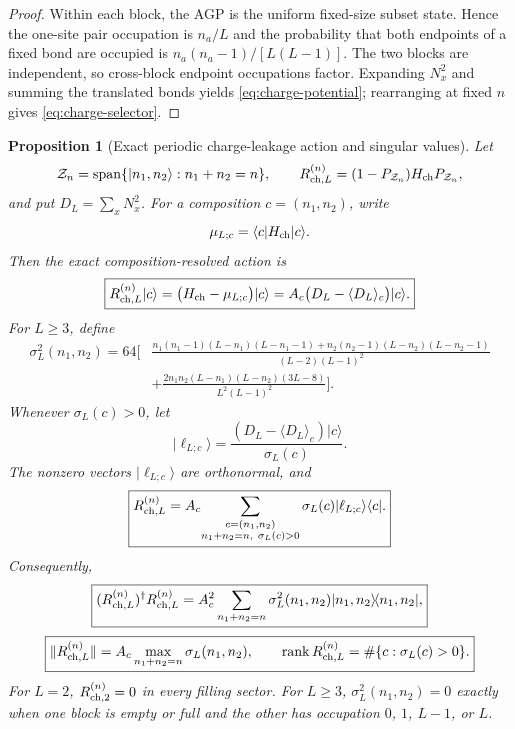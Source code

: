 \documentclass[11pt]{article}
\newtheorem{proposition}[theorem]{Proposition}
\theoremstyle{definition}
\theoremstyle{remark}
\newcommand{\ket}[1]{\lvert #1\rangle}
\newcommand{\bra}[1]{\langle #1\rvert}
\newcommand{\norm}[1]{\lVert #1\rVert}
\begin{document}
\begin{proof}
Within each block, the AGP is the uniform fixed-size subset state.  Hence the one-site pair occupation is $n_a/L$ and the probability that both endpoints of a fixed bond are occupied is $n_a(n_a-1)/[L(L-1)]$.  The two blocks are independent, so cross-block endpoint occupations factor.  Expanding $N_x^2$ and summing the translated bonds yields \eqref{eq:charge-potential}; rearranging at fixed $n$ gives \eqref{eq:charge-selector}.
\end{proof}

\begin{proposition}[Exact periodic charge-leakage action and singular values]
\label{prop:charge-leakage-periodic}
Let
\[
 \mathcal Z_n=\operatorname{span}\{\ket{n_1,n_2}:n_1+n_2=n\},
 \qquad
 R_{{\rm ch},L}^{(n)}=(1-P_{\mathcal Z_n})H_{\rm ch}P_{\mathcal Z_n},
\]
and put $D_L=\sum_x N_x^2$.  For a composition $c=(n_1,n_2)$, write
\[
 \mu_{L;c}=\bra cH_{\rm ch}\ket c.
\]
Then the exact composition-resolved action is
\begin{equation}
 \boxed{
 R_{{\rm ch},L}^{(n)}\ket c
 =\bigl(H_{\rm ch}-\mu_{L;c}\bigr)\ket c
 =A_c\bigl(D_L-\langle D_L\rangle_c\bigr)\ket c.}
 \label{eq:periodic-charge-leakage-action}
\end{equation}
For $L\ge3$, define
\begin{equation}
\boxed{
\begin{aligned}
\sigma_L^2(n_1,n_2)=64\Bigg[&
\frac{n_1(n_1-1)(L-n_1)(L-n_1-1)
+n_2(n_2-1)(L-n_2)(L-n_2-1)}{(L-2)(L-1)^2}\\
&+\frac{2n_1n_2(L-n_1)(L-n_2)(3L-8)}{L^2(L-1)^2}
\Bigg].
\end{aligned}}
\label{eq:periodic-charge-leakage-variance}
\end{equation}
Whenever $\sigma_L(c)>0$, let
\begin{equation}
 \ket{\ell_{L;c}}
 =\frac{(D_L-\langle D_L\rangle_c)\ket c}{\sigma_L(c)}.
 \label{eq:periodic-charge-left-singular-vector}
\end{equation}
The nonzero vectors $\ket{\ell_{L;c}}$ are orthonormal, and
\begin{equation}
 \boxed{
 R_{{\rm ch},L}^{(n)}
 =A_c\!\sum_{\substack{c=(n_1,n_2)\\n_1+n_2=n,\ \sigma_L(c)>0}}
 \sigma_L(c)\ket{\ell_{L;c}}\bra c.}
 \label{eq:periodic-charge-leakage-svd}
\end{equation}
Consequently,
\begin{equation}
 \boxed{
 (R_{{\rm ch},L}^{(n)})^\dagger R_{{\rm ch},L}^{(n)}
 =A_c^2\sum_{n_1+n_2=n}\sigma_L^2(n_1,n_2)
 \ket{n_1,n_2}\!\bra{n_1,n_2},}
 \label{eq:periodic-charge-leakage-gram}
\end{equation}
\begin{equation}
 \boxed{
 \norm{R_{{\rm ch},L}^{(n)}}
 =A_c\max_{n_1+n_2=n}\sigma_L(n_1,n_2),
 \qquad
 \operatorname{rank}R_{{\rm ch},L}^{(n)}
 =\#\{c:\sigma_L(c)>0\}.}
 \label{eq:periodic-charge-leakage-norm}
\end{equation}
For $L=2$, $R_{{\rm ch},2}^{(n)}=0$ in every filling sector.  For $L\ge3$,
$\sigma_L^2(n_1,n_2)=0$ exactly when one block is empty or full and the other
has occupation $0$, $1$, $L-1$, or $L$.
\end{proposition}
\end{document}
